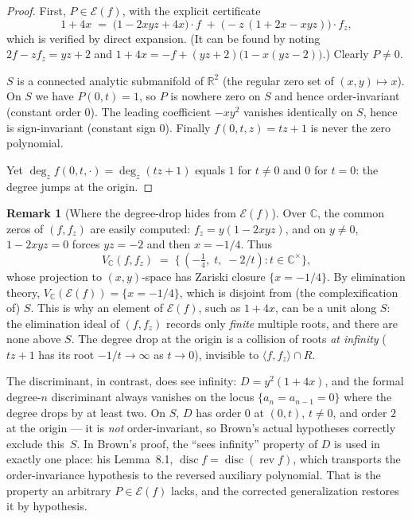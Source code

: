\documentclass[11pt,a4paper]{article}
\theoremstyle{definition}
\newtheorem{remark}[theorem]{Remark}
\newcommand{\R}{\mathbb{R}}
\newcommand{\C}{\mathbb{C}}
\newcommand{\disc}{\operatorname{disc}}
\newcommand{\rev}{\operatorname{rev}}
\newcommand{\E}{\mathcal{E}}
\newcommand{\ideal}[1]{\langle #1\rangle}
\begin{document}
\begin{proof}
First, $P \in \E(f)$, with the explicit certificate
\begin{equation}\label{eq:certificate}
  1 + 4x \;=\; \bigl(1 - 2xyz + 4x\bigr)\cdot f \;+\;
               \bigl(-z\,(1 + 2x - xyz)\bigr)\cdot f_z ,
\end{equation}
which is verified by direct expansion. (It can be found by noting
$2f - z f_z = yz + 2$ and $1+4x = -f + (yz+2)\bigl(1 - x(yz-2)\bigr)$.)
Clearly $P \neq 0$.

$S$ is a connected analytic submanifold of $\R^2$ (the regular zero set of
$(x,y)\mapsto x$). On $S$ we have $P(0,t) = 1$, so $P$ is nowhere zero on $S$
and hence order-invariant (constant order $0$). The leading coefficient
$-xy^2$ vanishes identically on $S$, hence is sign-invariant (constant sign
$0$). Finally $f(0,t,z) = tz + 1$ is never the zero polynomial.

Yet $\deg_z f(0,t,\cdot) = \deg_z (tz+1)$ equals $1$ for $t \neq 0$ and $0$ for
$t = 0$: the degree jumps at the origin.
\end{proof}

\begin{remark}[Where the degree-drop hides from $\E(f)$]\label{rem:variety}
Over $\C$, the common zeros of $(f, f_z)$ are easily computed: $f_z =
y(1-2xyz)$, and on $y \neq 0$, $1-2xyz=0$ forces $yz = -2$ and then $x =
-1/4$. Thus
\[
  V_\C(f, f_z) \;=\; \bigl\{\,(-\tfrac14,\; t,\; -2/t) : t \in \C^\times \bigr\},
\]
whose projection to $(x,y)$-space has Zariski closure $\{x = -1/4\}$. By
elimination theory, $V_\C(\E(f)) = \{x=-1/4\}$, which is disjoint from (the
complexification of) $S$. This is why an element of $\E(f)$, such as $1+4x$,
can be a unit along $S$: the elimination ideal of $(f,f_z)$ records only
\emph{finite} multiple roots, and there are none above $S$. The degree drop at
the origin is a collision of roots \emph{at infinity}
($tz+1$ has its root $-1/t \to \infty$ as $t \to 0$), invisible to
$\ideal{f,f_z} \cap R$.

The discriminant, in contrast, does see infinity: $D = y^2(1+4x)$, and the
formal degree-$n$ discriminant always vanishes on the locus
$\{a_n = a_{n-1} = 0\}$ where the degree drops by at least two. On $S$, $D$ has
order $0$ at $(0,t)$, $t\neq0$, and order $2$ at the origin --- it is
\emph{not} order-invariant, so Brown's actual hypotheses correctly exclude
this~$S$. In Brown's proof, the ``sees infinity'' property of $D$ is used in
exactly one place: his Lemma~8.1, $\disc f = \disc(\rev f)$, which transports
the order-invariance hypothesis to the reversed auxiliary polynomial. That is
the property an arbitrary $P \in \E(f)$ lacks, and the corrected
generalization restores it by hypothesis.
\end{remark}
\end{document}
